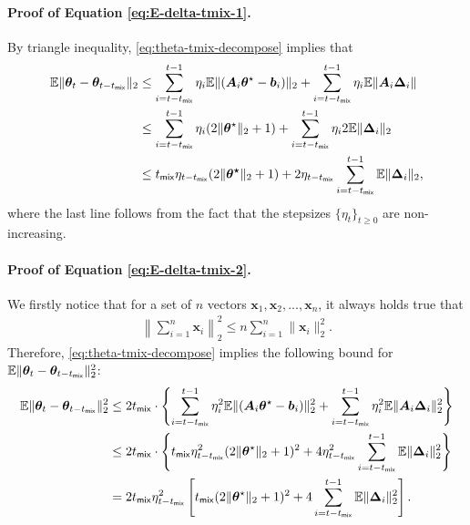 \paragraph{Proof of Equation \eqref{eq:E-delta-tmix-1}.} By triangle inequality, \eqref{eq:theta-tmix-decompose} implies that
\begin{align*}
\mathbb{E}\|\bm{\theta}_t - \bm{\theta}_{t-t_{\mathsf{mix}}}\|_2 & \leq  \sum_{i=t-t_{\mathsf{mix}}}^{t-1} \eta_i \mathbb{E}\|(\bm{A}_i\bm{\theta}^\star-\bm{b}_i)\|_2 + \sum_{i=t-t_{\mathsf{mix}}}^{t-1} \eta_i \mathbb{E}\|\bm{A}_i \bm{\Delta}_i\| \\ 
&\leq \sum_{i=t-t_{\mathsf{mix}}}^{t-1} \eta_i (2\|\bm{\theta}^\star\|_2+1) + \sum_{i=t-t_{\mathsf{mix}}}^{t-1} \eta_i 2\mathbb{E}\|\bm{\Delta}_i\|_2\\ 
&\leq t_{\mathsf{mix}}\eta_{t-t_{\mathsf{mix}}}(2\|\bm{\theta^\star}\|_2 + 1)+ 2\eta_{t - t_{\mathsf{mix}}}\sum_{i=t-t_{\mathsf{mix}}}^{t-1}\mathbb{E}\|\bm{\Delta}_i\|_2,
\end{align*}
where the last line follows from the fact that the stepsizes $\{\eta_t\}_{t \geq 0}$ are non-increasing.
\paragraph{Proof of Equation \eqref{eq:E-delta-tmix-2}.} We firstly notice that for a set of $n$ vectors $\bm{x}_1,\bm{x}_2,...,\bm{x}_n$, it always holds true that
\begin{align*}
\left\|\sum_{i=1}^n \bm{x}_i\right\|_2^2 \leq n \sum_{i=1}^n \|\bm{x}_i\|_2^2.
\end{align*}
Therefore, \eqref{eq:theta-tmix-decompose} implies the following bound for $\mathbb{E}\|\bm{\theta}_t - \bm{\theta}_{t-t_{\mathsf{mix}}}\|_2^2$:
\begin{align*}
\mathbb{E}\|\bm{\theta}_t - \bm{\theta}_{t-t_{\mathsf{mix}}}\|_2^2 &\leq 2t_{\mathsf{mix}} \cdot \left\{\sum_{i=t-t_{\mathsf{mix}}}^{t-1} \eta_i^2 \mathbb{E}\|(\bm{A}_i\bm{\theta}^\star-\bm{b}_i)\|_2^2 + \sum_{i=t-t_{\mathsf{mix}}}^{t-1} \eta_i^2 \mathbb{E}\|\bm{A}_i \bm{\Delta}_i\|_2^2\right\} \\ 
&\leq 2t_{\mathsf{mix}}\cdot \left\{t_{\mathsf{mix}} \eta_{t-t_{\mathsf{mix}}}^2 (2\|\bm{\theta}^\star\|_2+1)^2 + 4 \eta_{t-t_{\mathsf{mix}}}^2 \sum_{i=t-t_{\mathsf{mix}}}^{t-1} \mathbb{E}\|\bm{\Delta}_i\|_2^2\right\}\\ 
&= 2t_{\mathsf{mix}}\eta_{t-t_{\mathsf{mix}}}^2\left[t_{\mathsf{mix}}(2\|\bm{\theta}^\star\|_2+1)^2 + 4 \sum_{i=t-t_{\mathsf{mix}}}^{t-1} \mathbb{E}\|\bm{\Delta}_i\|_2^2\right].
\end{align*}
